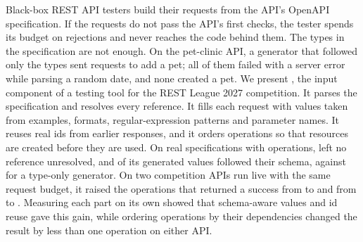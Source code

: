 Black-box REST API testers build their requests from the API's OpenAPI
specification. If the requests do not pass the API's first checks, the tester
spends its budget on rejections and never reaches the code behind them. The
types in the specification are not enough. On the pet-clinic API, a generator
that followed only the types sent \NMotivBaselineRequests requests to add a
pet; all of them failed with a server error while parsing a random date, and
none created a pet. We present \tool, the input component of a testing tool
for the REST League 2027 competition. It parses the specification and
resolves every reference. It fills each request with values taken from
examples, formats, regular-expression patterns and parameter names. It reuses
real ids from earlier responses, and it orders operations so that resources
are created before they are used. On \NSpecs real specifications with
\NOpsTotal operations, \tool left no reference unresolved, and \NConfTool of
its generated values followed their schema, against \NConfBaseline for a
type-only generator. On two competition APIs run live with the same request
budget, it raised the operations that returned a success from
\NPetclinicBaselineCov to \NPetclinicFullCov and from
\NGestaohospitalBaselineCov to \NGestaohospitalFullCov. Measuring each part
on its own showed that schema-aware values and id reuse gave this gain, while
ordering operations by their dependencies changed the result by less than one
operation on either API.
